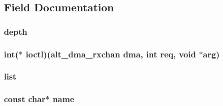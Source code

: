 \subsection{\-Field \-Documentation}
\hypertarget{structalt__dma__rxchan__dev__s_afd8dffe5373527164cd8341e4c1d479d}{
\subsubsection[{depth}]{ {\bf depth}}}\label{structalt__dma__rxchan__dev__s_afd8dffe5373527164cd8341e4c1d479d}
\hypertarget{structalt__dma__rxchan__dev__s_afd98a37c84f8d21e5f870c44e0a84cfb}{
\subsubsection[{ioctl}]{\setlength{\rightskip}{0pt plus 5cm}int($\ast$ {\bf ioctl})({\bf alt\-\_\-dma\-\_\-rxchan} dma, int req, void $\ast$arg)}}\label{structalt__dma__rxchan__dev__s_afd98a37c84f8d21e5f870c44e0a84cfb}
\hypertarget{structalt__dma__rxchan__dev__s_a3f58d046b28735c0e628aa1de56acd9b}{
\subsubsection[{list}]{ {\bf list}}}\label{structalt__dma__rxchan__dev__s_a3f58d046b28735c0e628aa1de56acd9b}
\hypertarget{structalt__dma__rxchan__dev__s_a8f8f80d37794cde9472343e4487ba3eb}{
\subsubsection[{name}]{\setlength{\rightskip}{0pt plus 5cm}const char$\ast$ {\bf name}}}\label{structalt__dma__rxchan__dev__s_a8f8f80d37794cde9472343e4487ba3eb}
